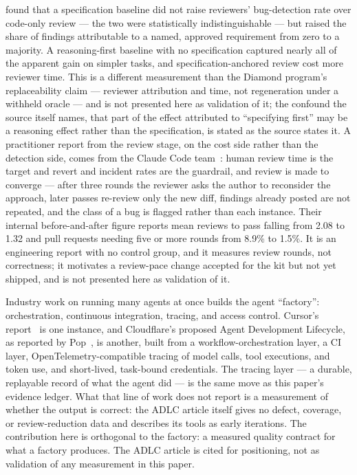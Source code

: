 \documentclass[11pt]{article}
\begin{document}
found that a specification baseline did not raise reviewers' bug-detection
rate over code-only review --- the two were statistically indistinguishable
--- but raised the share of findings attributable to a named, approved
requirement from zero to a majority. A reasoning-first baseline with no
specification captured nearly all of the apparent gain on simpler tasks, and
specification-anchored review cost more reviewer time. This is a different
measurement than the Diamond program's replaceability claim --- reviewer
attribution and time, not regeneration under a withheld oracle --- and is not
presented here as validation of it; the confound the source itself names,
that part of the effect attributed to ``specifying first'' may be a
reasoning effect rather than the specification, is stated as the source
states it.
A practitioner report from the review stage, on the cost side rather than the
detection side, comes from the Claude Code team~\cite{osmani2026review}: human
review time is the target and revert and incident rates are the guardrail, and
review is made to converge --- after three rounds the reviewer asks the author
to reconsider the approach, later passes re-review only the new diff, findings
already posted are not repeated, and the class of a bug is flagged rather than
each instance. Their internal before-and-after figure reports mean reviews to
pass falling from 2.08 to 1.32 and pull requests needing five or more rounds
from 8.9\% to 1.5\%. It is an engineering report with no control group, and it
measures review rounds, not correctness; it motivates a review-pace change
accepted for the kit but not yet shipped, and is not presented here as
validation of it.

Industry work on running many agents at once builds the agent ``factory'':
orchestration, continuous integration, tracing, and access control. Cursor's
report~\cite{lin2026selfdriving} is one instance, and Cloudflare's proposed
Agent Development Lifecycle, as reported by Pop~\cite{cloudflare2026adlc}, is
another, built from a workflow-orchestration layer, a CI layer, OpenTelemetry-compatible
tracing of model calls, tool executions, and token use, and short-lived,
task-bound credentials. The tracing layer --- a durable, replayable record of
what the agent did --- is the same move as this paper's evidence ledger. What
that line of work does not report is a measurement of whether the output is
correct: the ADLC article itself gives no defect, coverage, or review-reduction
data and describes its tools as early iterations. The contribution here is
orthogonal to the factory: a measured quality contract for what a factory
produces. The ADLC article is cited for positioning, not as validation of any
measurement in this paper.
\end{document}
